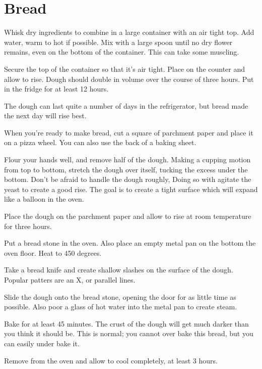 \section{Bread}
\begin{recipe}


Whisk dry ingredients to combine in a large container with an air tight top. Add water, warm to hot if possible. Mix with a large spoon until no dry flower remains, even on the bottom of the container. This can take some muscling.

Secure the top of the container so that it's air tight. Place on the counter and allow to rise. Dough should double in volume over the course of three hours. Put in the fridge for at least 12 hours.

The dough can last quite a number of days in the refrigerator, but bread made the next day will rise best.

When you're ready to make bread, cut a square of parchment paper and place it on a pizza wheel. You can also use the back of a baking sheet.

Flour your hands well, and remove half of the dough. Making a cupping motion from top to bottom, stretch the dough over itself, tucking the excess under the bottom. Don't be afraid to handle the dough roughly, Doing so with agitate the yeast to create a good rise. The goal is to create a tight surface which will expand like a balloon in the oven.

Place the dough on the parchment paper and allow to rise at room temperature for three hours.

Put a bread stone in the oven. Also place an empty metal pan on the bottom the oven floor. Heat to 450 degrees.

Take a bread knife and create shallow slashes on the surface of the dough. Popular patters are an X, or parallel lines.

Slide the dough onto the bread stone, opening the door for as little time as possible. Also poor a glass of hot water into the metal pan to create steam.

Bake for at least 45 minutes. The crust of the dough will get much darker than you think it should be. This is normal; you cannot over bake this bread, but you can easily under bake it.

Remove from the oven and allow to cool completely, at least 3 hours.


\end{recipe}
